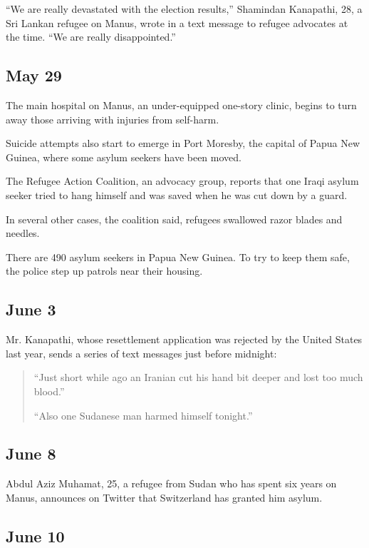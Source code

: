``We are really devastated with the election results,'' Shamindan
Kanapathi, 28, a Sri Lankan refugee on Manus, wrote in a text message to
refugee advocates at the time. ``We are really disappointed.''

\hypertarget{may-29}{%
\subsection{May 29}\label{may-29}}

The main hospital on Manus, an under-equipped one-story clinic, begins
to turn away those arriving with injuries from self-harm.

Suicide attempts also start to emerge in Port Moresby, the capital of
Papua New Guinea, where some asylum seekers have been moved.

The Refugee Action Coalition, an advocacy group, reports that one Iraqi
asylum seeker tried to hang himself and was saved when he was cut down
by a guard.

In several other cases, the coalition said, refugees swallowed razor
blades and needles.

There are 490 asylum seekers in Papua New Guinea. To try to keep them
safe, the police step up patrols near their housing.

\hypertarget{june-3}{%
\subsection{June 3}\label{june-3}}

Mr. Kanapathi, whose resettlement application was rejected by the United
States last year, sends a series of text messages just before midnight:

\begin{quote}
``Just short while ago an Iranian cut his hand bit deeper and lost too
much blood.''

``Also one Sudanese man harmed himself tonight.''
\end{quote}

\hypertarget{june-8}{%
\subsection{June 8}\label{june-8}}

Abdul Aziz Muhamat, 25, a refugee from Sudan who has spent six years on
Manus, announces on Twitter that Switzerland has granted him asylum.

\hypertarget{june-10}{%
\subsection{June 10}\label{june-10}}

